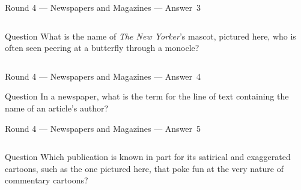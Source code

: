 \documentclass[11pt]{beamer}
\begin{document}
\begin{frame}[t]{Round 4 --- Newspapers and Magazines --- \mbox{Answer 3}}
    \vspace{-0.5em}
    \begin{columns}[T,totalwidth=\linewidth]
        \begin{column}{0.32\linewidth}
            \begin{block}{Question}
                What is the name of \emph{The New Yorker}'s mascot, pictured here, who is often seen peering at a butterfly through a monocle?
            \end{block}
        \end{column}
        \begin{column}{0.65\linewidth}
            \begin{center}
                \texttt{[image: \{Images/eusticetilley]}.jpg}
            \end{center}
        \end{column}
    \end{columns}
\end{frame}
\begin{frame}[t]{Round 4 --- Newspapers and Magazines --- \mbox{Answer 4}}
    \vspace{-0.5em}
    \begin{block}{Question}
        In a newspaper, what is the term for the line of text containing the name of an article's author?
    \end{block}
\end{frame}
\begin{frame}[t]{Round 4 --- Newspapers and Magazines --- \mbox{Answer 5}}
    \vspace{-0.5em}
    \begin{columns}[T,totalwidth=\linewidth]
        \begin{column}{0.32\linewidth}
            \begin{block}{Question}
                Which publication is known in part for its satirical and exaggerated cartoons, such as the one pictured here, that poke fun at the very nature of commentary cartoons?
            \end{block}
        \end{column}
        \begin{column}{0.65\linewidth}
            \begin{center}
                \texttt{[image: \{Images/onioncartoon]}.jpg}
            \end{center}
        \end{column}
    \end{columns}
\end{frame}
\end{document}
